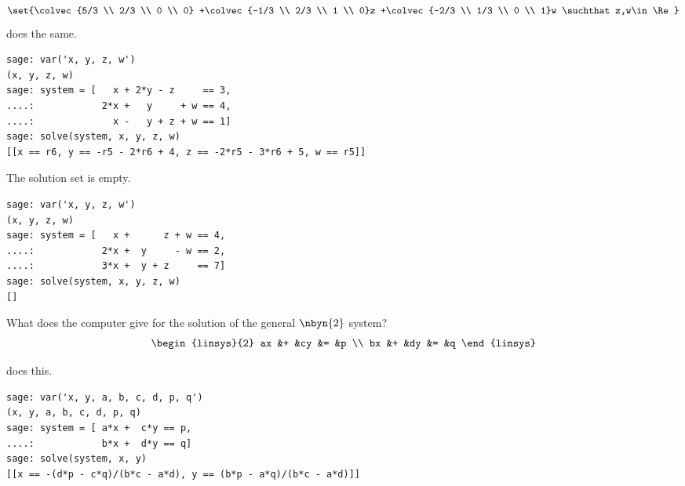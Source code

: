 \begin{exercises}
\begin{answer}
\begin{exparts}
\begin{equation*}
             \set{\colvec{5/3 \\ 2/3 \\ 0 \\ 0}
                  +\colvec{-1/3 \\ 2/3 \\ 1 \\ 0}z
                  +\colvec{-2/3 \\ 1/3 \\ 0 \\ 1}w
                  \suchthat z,w\in\Re}
           \end{equation*}
           \Sage{} does the same.
\begin{lstlisting}
sage: var('x, y, z, w')
(x, y, z, w)
sage: system = [   x + 2*y - z     == 3,
....:            2*x +   y     + w == 4,
....:              x -   y + z + w == 1]
sage: solve(system, x, y, z, w)
[[x == r6, y == -r5 - 2*r6 + 4, z == -2*r5 - 3*r6 + 5, w == r5]]             
\end{lstlisting}
        \partsitem The solution set is empty.
\begin{lstlisting}
sage: var('x, y, z, w')
(x, y, z, w)
sage: system = [   x +      z + w == 4,
....:            2*x +  y     - w == 2,
....:            3*x +  y + z     == 7]
sage: solve(system, x, y, z, w)
[]          
\end{lstlisting}
      \end{exparts}
    \end{answer}
  \item 
    What does the computer give for the solution of the general
    $\nbyn{2}$  system?
    \begin{equation*}
      \begin{linsys}{2}
        ax  &+  &cy  &=  &p  \\
        bx  &+  &dy  &=  &q
      \end{linsys}
    \end{equation*}
    \begin{answer}
      \Sage{} does this.
\begin{lstlisting}
sage: var('x, y, a, b, c, d, p, q')
(x, y, a, b, c, d, p, q)
sage: system = [ a*x +  c*y == p,
....:            b*x +  d*y == q]
sage: solve(system, x, y)
[[x == -(d*p - c*q)/(b*c - a*d), y == (b*p - a*q)/(b*c - a*d)]]        
\end{lstlisting}
    \end{answer}
\end{exercises}
\endinput


